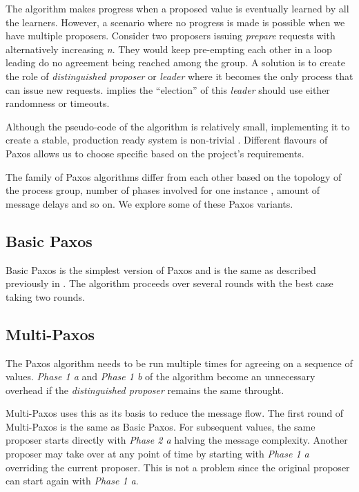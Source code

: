 The algorithm makes progress when a proposed value is eventually learned by all
the learners. However, a scenario where no progress is made is possible when we 
have multiple proposers. Consider two proposers issuing \emph{prepare} requests
with alternatively increasing \emph{n}. They would keep pre-empting each other
in a loop leading do no agreement being reached among the group. A solution is
to create the role of \emph{distinguished proposer} or \emph{leader} where it
becomes the only process that can issue new requests. \citet{FisLynPat85}
implies the ``election'' of this \emph{leader} should use either randomness
or timeouts.

Although the pseudo-code of the algorithm is relatively small, implementing it
to create a stable, production ready system is non-trivial \citep{ChandraGR07}.
Different flavours of Paxos allows us to choose specific based on the project's
requirements.

The family of Paxos algorithms differ from each other based on the topology
of the process group, number of phases involved for one instance%
, amount of message delays and so on. We explore some of these Paxos variants.

\subsection{Basic Paxos}

Basic Paxos is the simplest version of Paxos and is the same as described 
previously in . The algorithm proceeds over several rounds
with the best case taking two rounds.

\subsection{Multi-Paxos}

The Paxos algorithm needs to be run multiple times for agreeing on a sequence of
values. \emph{Phase 1 a} and \emph{Phase 1 b} of the algorithm become 
an unnecessary overhead if the \emph{distinguished proposer} remains the same 
throught.

Multi-Paxos uses this as its basis to reduce the message flow. The first round 
of Multi-Paxos is the same as Basic Paxos. For subsequent values, the same
proposer starts directly with \emph{Phase 2 a} halving the message complexity.
Another proposer may take over at any point of time by starting with 
\emph{Phase 1 a} overriding the current proposer. This is not a problem since 
the original proposer can start again with \emph{Phase 1 a}.

